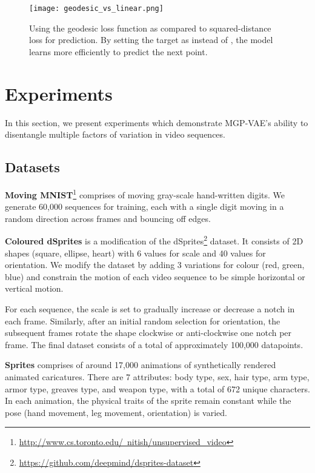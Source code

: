 \documentclass[runningheads]{llncs}
\begin{document}
	 \begin{figure} [H]
      \centering  
\texttt{[image: geodesic\_vs\_linear.png]}      
      \caption{Using the geodesic loss function as compared to squared-distance loss for prediction. By setting the target as  instead of , the model learns more efficiently to predict the next point.}
      \label{fig:geodesic_loss}
   \end{figure}

   \section{Experiments}
   In this section, we present experiments which demonstrate MGP-VAE's ability to disentangle multiple factors of variation in video sequences. \par
   
   \subsection{Datasets}
    
    \textbf{Moving MNIST}\footnote{\href{http://www.cs.toronto.edu/~nitish/unsupervised\_video}{http://www.cs.toronto.edu/~nitish/unsupervised\_video}} \cite{mmnist} comprises of moving gray-scale hand-written digits. We generate 60,000 sequences for training, each with a single digit moving in a random direction across frames and bouncing off edges. \par
   
    \noindent \textbf{Coloured dSprites} is a modification of the dSprites\footnote{\href{https://github.com/deepmind/dsprites-dataset}{https://github.com/deepmind/dsprites-dataset}} \cite{Higgins2017betaVAELB} dataset. It consists of 2D shapes (square, ellipse, heart) with 6 values for scale and 40 values for orientation. We modify the dataset by adding 3 variations for colour (red, green, blue) and constrain the motion of each video sequence to be simple horizontal or vertical motion. \par 

   For each sequence, the scale is set to gradually increase or decrease a notch in each frame. Similarly, after an initial random selection for orientation, the subsequent frames rotate the shape clockwise or anti-clockwise one notch per frame. The final dataset consists of a total of approximately 100,000 datapoints. \par

   \noindent \textbf{Sprites} \cite{Reed2015DeepVA} comprises of around 17,000 animations of synthetically rendered animated caricatures. There are 7 attributes: body type, sex, hair type, arm type, armor type, greaves type, and weapon type, with a total of 672 unique characters. In each animation, the physical traits of the sprite remain constant while the pose (hand movement, leg movement, orientation) is varied. \par
   
\end{document}
